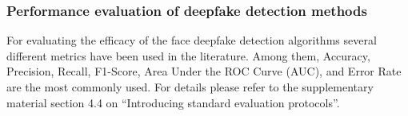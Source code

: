 

\subsubsection{Performance evaluation of deepfake detection methods}

For evaluating the efficacy of the face deepfake detection algorithms several different metrics have been used in the literature. Among them, Accuracy, Precision, Recall, F1-Score, Area Under the ROC Curve (AUC), and Error Rate are the most commonly used. For details please refer to the supplementary material section 4.4 on ``Introducing standard evaluation protocols''.


 

